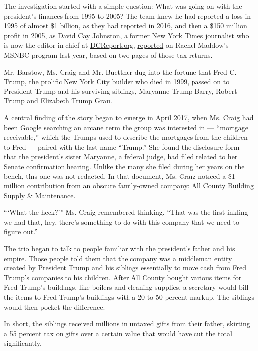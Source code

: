 The investigation started with a simple question: What was going on with
the president's finances from 1995 to 2005? The team knew he had
reported a loss in 1995 of almost \$1 billion, as
\href{https://www.nytimes.com/2016/10/02/us/politics/donald-trump-taxes.html}{they
had reported} in 2016, and then a \$150 million profit in 2005, as David
Cay Johnston, a former New York Times journalist who is now the
editor-in-chief at \href{https://www.dcreport.org/}{DCReport.org},
\href{https://www.nytimes.com/2017/03/14/us/politics/donald-trump-taxes.html}{reported}
on Rachel Maddow's MSNBC program last year, based on two pages of those
tax returns.

Mr. Barstow, Ms. Craig and Mr. Buettner dug into the fortune that Fred
C. Trump, the prolific New York City builder who died in 1999, passed on
to President Trump and his surviving siblings, Maryanne Trump Barry,
Robert Trump and Elizabeth Trump Grau.

A central finding of the story began to emerge in April 2017, when Ms.
Craig had been Google searching an arcane term the group was interested
in --- ``mortgage receivable,'' which the Trumps used to describe the
mortgages from the children to Fred --- paired with the last name
``Trump.'' She found the disclosure form that the president's sister
Maryanne, a federal judge, had filed related to her Senate confirmation
hearing. Unlike the many she filed during her years on the bench, this
one was not redacted. In that document, Ms. Craig noticed a \$1 million
contribution from an obscure family-owned company: All County Building
Supply \& Maintenance.

```What the heck?''' Ms. Craig remembered thinking. ``That was the first
inkling we had that, hey, there's something to do with this company that
we need to figure out.''

The trio began to talk to people familiar with the president's father
and his empire. Those people told them that the company was a middleman
entity created by President Trump and his siblings essentially to move
cash from Fred Trump's companies to his children. After All County
bought various items for Fred Trump's buildings, like boilers and
cleaning supplies, a secretary would bill the items to Fred Trump's
buildings with a 20 to 50 percent markup. The siblings would then pocket
the difference.

In short, the siblings received millions in untaxed gifts from their
father, skirting a 55 percent tax on gifts over a certain value that
would have cut the total significantly.

